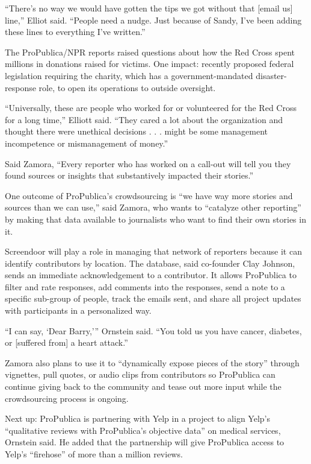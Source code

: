 \begin{itemize}
\begin{enumerate}
{``There’s no way we would have gotten the tips we got without that [email us] line,'' Elliot said. ``People need a nudge. Just because of Sandy, I’ve been adding these lines to everything I’ve written.''

The ProPublica/NPR reports raised questions about how the Red Cross spent millions in donations raised for victims. One impact: recently proposed federal legislation requiring the charity, which has a government-mandated disaster-response role, to open its operations to outside oversight.

``Universally, these are people who worked for or volunteered for the Red Cross for a long time,'' Elliott said. ``They cared a lot about the organization and thought there were unethical decisions . . . might be some management incompetence or mismanagement of money.''  

Said Zamora, ``Every reporter who has worked on a call-out will tell you they found sources or insights that substantively impacted their stories.''

One outcome of ProPublica’s crowdsourcing is ``we have way more stories and sources than we can use,'' said Zamora, who wants to ``catalyze other reporting'' by making that data available to journalists who want to find their own stories in it.

Screendoor will play a role in managing that network of reporters because it can identify contributors by location. The database, said co-founder Clay Johnson, sends an immediate acknowledgement to a contributor. It allows ProPublica to filter and rate responses, add comments into the responses, send a note to a specific sub-group of people, track the emails sent, and share all project updates with participants in a personalized way. 

``I can say, ‘Dear Barry,’'' Ornstein said. ``You told us you have cancer, diabetes, or [suffered from] a heart attack.''

Zamora also plans to use it to ``dynamically expose pieces of the story'' through vignettes, pull quotes, or audio clips from contributors so ProPublica can continue giving back to the community and tease out more input while the crowdsourcing process is ongoing.\autocite{Zamora}

Next up: ProPublica is partnering with Yelp in a project to align Yelp’s ``qualitative reviews with ProPublica’s objective data'' on medical services, Ornstein said. He added that the partnership will give ProPublica access to Yelp’s ``firehose'' of more than a million reviews.\autocite{Ornstein}

}
\end{enumerate}
\end{itemize}
